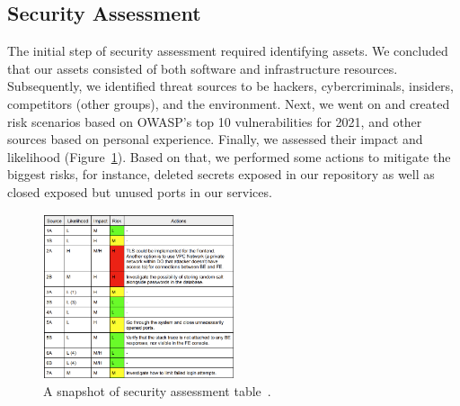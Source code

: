 \subsection{Security Assessment}

The initial step of security assessment required identifying assets. We concluded that our assets consisted of both software and infrastructure resources. Subsequently, we identified threat sources to be hackers, cybercriminals, insiders, competitors (other groups), and the environment. Next, we went on and created risk scenarios based on OWASP's top 10 vulnerabilities for 2021, and other sources based on personal experience. Finally, we assessed their impact and likelihood (Figure~\ref{fig:securityAssessment}). Based on that, we performed some actions to mitigate the biggest risks, for instance, deleted secrets exposed in our repository as well as closed exposed but unused ports in our services.

\begin{figure}[h]
\centering
\includegraphics[width=0.5\textwidth]{images/SecurityAssessmentSnapshot.png}
\caption{A snapshot of security assessment table~\cite{securityAssessment}.}
\label{fig:securityAssessment}
\end{figure}